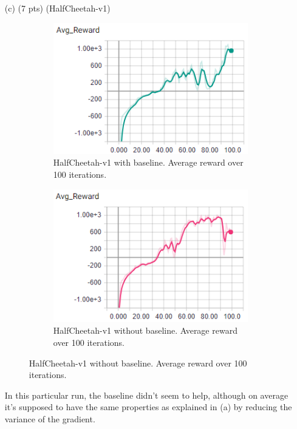 \documentclass{article}
\begin{document}
\begin{enumerate}
\item[(c) (7 pts)](HalfCheetah-v1)

\begin{figure}[H]
	\centering
	\begin{subfigure}[b]{.4\textwidth}
		\centering
		\includegraphics[width=0.9\linewidth]{cheetah-baseline-avgreward.png}
		\caption{HalfCheetah-v1 with baseline. Average reward over 100 iterations.}
	\end{subfigure}
	\qquad
	\begin{subfigure}[b]{.4\textwidth}
		\centering
		\includegraphics[width=0.9\linewidth]{cheetah-nobaseline-avgreward.png}
		\caption{HalfCheetah-v1 without baseline. Average reward over 100 iterations.}
	\end{subfigure}
\end{figure}

In this particular run, the baseline didn't seem to help, although on average it's supposed to have the same properties as explained in (a) by reducing the variance of the gradient.

\end{enumerate}
 \newpage
\end{document}
